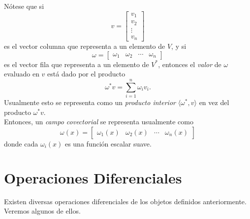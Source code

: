 Nótese que si
\begin{equation*}
	v = \begin{bmatrix}
		v_1    \\
		v_2    \\
		\vdots \\
		v_n
	\end{bmatrix}
\end{equation*}
es el vector columna que representa a un elemento de $V$, y si
\begin{equation*}
	\omega = \begin{bmatrix}
		\omega_1 & \omega_2 & \cdots & \omega_n
	\end{bmatrix}
\end{equation*}
es el vector fila que representa a un elemento de $V^*$, entonces el \textit{valor} de $\omega$ evaluado en $v$ está dado por el producto
\begin{equation*}
	\omega^* v = \sum_{i=1}^n \omega_i v_i.
\end{equation*}
Usualmente esto se representa como un \textit{producto interior} $\langle \omega^*, v \rangle$ en vez del producto $\omega^* v$.\\
Entonces, un \textit{campo covectorial} se representa usualmente como
\begin{equation*}
	\omega(x) = \begin{bmatrix}
		\omega_1(x) & \omega_2(x) & \cdots & \omega_n(x)
	\end{bmatrix}
\end{equation*}
donde cada $\omega_i(x)$ es una función escalar suave.

\section{Operaciones Diferenciales}
Existen diversas operaciones diferenciales de los objetos definidos anteriormente. Veremos algunos de ellos.
